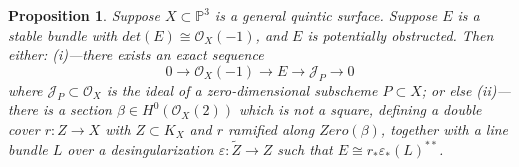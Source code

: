\documentclass{amsart}
\theoremstyle{plain}
\newtheorem{proposition}[theorem]{Proposition}
\numberwithin{equation}{section}
\begin{document}
\begin{proposition}
\label{mainclassif}
Suppose $X\subset {{\mathbb P}} ^3$ is a general quintic surface. Suppose $E$ is a
stable bundle with $det (E)\cong {{\mathcal O}} _X(-1)$, and $E$ is potentially obstructed. Then either:
\newline
(i)---there exists an exact sequence 
\begin{equation}
\label{iseq}
0\rightarrow {{\mathcal O}} _X(-1)\rightarrow E \rightarrow {{\mathcal J}} _{P} \rightarrow 0
\end{equation}
where ${{\mathcal J}} _P\subset {{\mathcal O}} _X$ is the ideal of a zero-dimensional subscheme $P\subset X$;
or else 
\newline
(ii)---there is a section $\beta \in H^0({{\mathcal O}} _X(2))$ which is not a square, defining
a double cover $r:Z\rightarrow X$ with $Z\subset K_X$ and $r$ ramified along $Zero (\beta )$,
together with a line bundle $L$ over a desingularization $\varepsilon : \tilde{Z}\rightarrow Z$
such that $E\cong r_{\ast}\varepsilon _{\ast}(L)^{\ast \ast}$. 
\end{proposition}
\end{document}
